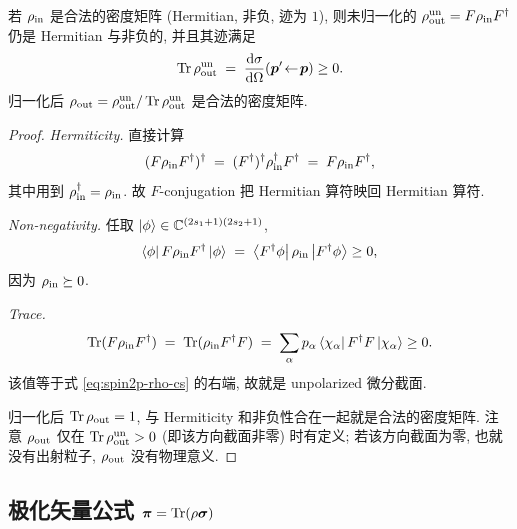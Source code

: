 \begin{proposition}\label{prop:spin2p-rho-properties}
若 $\rho_{\rm in}$ 是合法的密度矩阵 (Hermitian, 非负, 迹为 $1$), 则未归一化的 $\rho_{\rm out}^{\rm un}=F\rho_{\rm in}F^\dagger$ 仍是 Hermitian 与非负的, 并且其迹满足
\begin{equation}
  \operatorname{Tr}\rho_{\rm out}^{\rm un}\;=\;\frac{\mathrm{d}\sigma}{\mathrm{d}\Omega}(\bm p'\!\leftarrow\!\bm p)\ge 0.
  \label{eq:spin2p-rho-trace-nn}
\end{equation}
归一化后 $\rho_{\rm out}=\rho_{\rm out}^{\rm un}/\operatorname{Tr}\rho_{\rm out}^{\rm un}$ 是合法的密度矩阵.
\end{proposition}

\begin{proof}
\emph{Hermiticity.} 直接计算
\begin{equation}
  (F\rho_{\rm in}F^\dagger)^\dagger\;=\;(F^\dagger)^\dagger \rho_{\rm in}^\dagger F^\dagger\;=\;F\rho_{\rm in}F^\dagger,
\end{equation}
其中用到 $\rho_{\rm in}^\dagger=\rho_{\rm in}$. 故 $F$-conjugation 把 Hermitian 算符映回 Hermitian 算符.

\emph{Non-negativity.} 任取 $\ket{\phi}\in\mathbb{C}^{(2s_1+1)(2s_2+1)}$,
\begin{equation}
  \bra\phi F\rho_{\rm in}F^\dagger\ket\phi\;=\;\bra{F^\dagger\phi}\rho_{\rm in}\ket{F^\dagger\phi}\ge 0,
\end{equation}
因为 $\rho_{\rm in}\succeq 0$.

\emph{Trace.}
\begin{equation}
  \operatorname{Tr}(F\rho_{\rm in}F^\dagger)\;=\;\operatorname{Tr}(\rho_{\rm in}F^\dagger F)
  \;=\;\sum_\alpha p_\alpha\bra{\chi_\alpha}F^\dagger F\ket{\chi_\alpha}\ge 0.
\end{equation}
该值等于式 \eqref{eq:spin2p-rho-cs} 的右端, 故就是 unpolarized 微分截面.

归一化后 $\operatorname{Tr}\rho_{\rm out}=1$, 与 Hermiticity 和非负性合在一起就是合法的密度矩阵. 注意 $\rho_{\rm out}$ 仅在 $\operatorname{Tr}\rho_{\rm out}^{\rm un}>0$ (即该方向截面非零) 时有定义; 若该方向截面为零, 也就没有出射粒子, $\rho_{\rm out}$ 没有物理意义.
\end{proof}

\subsection{\texorpdfstring{极化矢量公式 $\bm\pi=\operatorname{Tr}(\rho\bm\sigma)$}{极化矢量公式}}\label{sec:spin2p-polvec}

